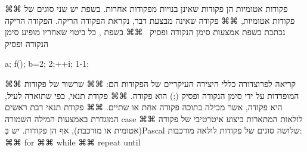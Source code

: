 \begin{enumerate}
⌘⌘  פקודות אטומיות הן פקודות שאינן בנויות מפקודות אחרות. בשפת  יש שני סוגים של פקודות אטומיות,
  ⌘⌘  פקודה שאינה מבצעת דבר, נקראת הפקודה הריקה. הפקודה הריקה נכתבת בשפת אמצעות סימן הנקודה ופסיק~\cc{;}
  ⌘⌘  בשפת , כל ביטוי שאחריו מופיע סימן הנקודה ופסיק~\cc{;}
      \begin{CPLUSPLUS}
      a; f(); b=2; 2;++i; 1-1;
         \end{CPLUSPLUS}
      ⌘⌘ קריאה לפרוצדורה
      כללי היצירה העיקריים של הפקודות הם:
      ⌘⌘ שרשור של פקודות המופרדות על ידי סימן הנקודה ופסיק (;) הוא פקודה.
      ⌘⌘ פקודת תנאי, כפי שתוארה לעיל, היא פקודה, אשר מכילה בתוכה פקודה אחת או שתיים.
      ⌘⌘ פקודת תנאי רבת ראשים המוגדרת באמצעות המילה השמורה case
      ⌘⌘ לולאות המתארות ביצוע איטרטיבי של פקודה (אטומית או מורכבת), אף הן פקודות. יש בְּPascal שלושה סוגים של פקודות לולאה מורכבות:
      ⌘⌘ for
      ⌘⌘ while
      ⌘⌘ repeat until
\end{enumerate}

